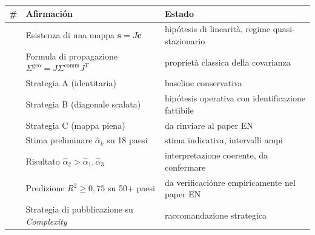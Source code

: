 {\def\LTcaptype{none} %
{\small\begin{longtable}[]{@{}
  >{\raggedright\arraybackslash}p{}
  >{\raggedright\arraybackslash}p{}
  >{\raggedright\arraybackslash}p{}@{}}
\toprule\noalign{}
\begin{minipage}[b]{\linewidth}\raggedright
\#
\end{minipage} & \begin{minipage}[b]{\linewidth}\raggedright
Afirmación
\end{minipage} & \begin{minipage}[b]{\linewidth}\raggedright
Estado
\end{minipage} \\
\midrule\noalign{}
\endhead
\bottomrule\noalign{}
\endlastfoot
1 & Esistenza di una mappa \(\mathbf{s} = J \mathbf{c}\) & \Hypoth{}
hipótesis di linearità, regime quasi-stazionario \\
2 & Formula di propagazione
\(\Sigma^{\text{geo}} = J \Sigma^{\text{comm}} J^T\) & \Proved{}
proprietà classica della covarianza \\
3 & Strategia A (identitaria) & \Hypoth{} baseline conservativa \\
4 & Strategia B (diagonale scalata) & \Hypoth{} hipótesis operativa con
identificazione fattibile \\
5 & Strategia C (mappa piena) & \Conj{} da rinviare al paper EN \\
6 & Stima preliminare \(\hat\alpha_k\) su 18 paesi & \Conj{} stima
indicativa, intervalli ampi \\
7 & Risultato \(\hat\alpha_2 > \hat\alpha_1, \hat\alpha_3\) & \Hypoth{}
interpretazione coerente, da confermare \\
8 & Predizione \(R^2 \geq 0{,}75\) su 50+ paesi & \ToVerify{} da
verificaciónre empiricamente nel paper EN \\
9 & Strategia di pubblicazione su \emph{Complexity} & \Hypoth{}
raccomandazione strategica \\
\end{longtable}}
}


